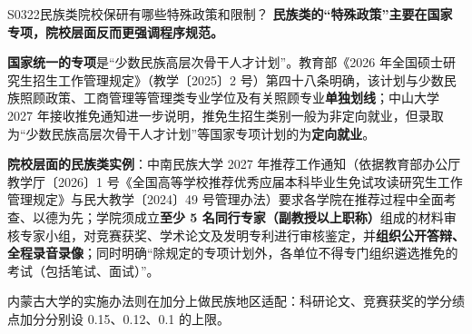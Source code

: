 \begin{qa}{S0322}{民族类院校保研有哪些特殊政策和限制？}
\textbf{民族类的“特殊政策”主要在国家专项，院校层面反而更强调程序规范。}

\textbf{国家统一的专项}是“少数民族高层次骨干人才计划”。教育部《2026 年全国硕士研究生招生工作管理规定》（教学〔2025〕2 号）第四十八条明确，该计划与少数民族照顾政策、工商管理等管理类专业学位及有关照顾专业\textbf{单独划线}；中山大学 2027 年接收推免通知进一步说明，推免生招生类别一般为非定向就业，但录取为“少数民族高层次骨干人才计划”等国家专项计划的为\textbf{定向就业}。

\textbf{院校层面的民族类实例}：中南民族大学 2027 年推荐工作通知（依据教育部办公厅教学厅〔2026〕1 号《全国高等学校推荐优秀应届本科毕业生免试攻读研究生工作管理规定》与民大教学〔2024〕49 号管理办法）要求各学院在推荐过程中全面考查、以德为先；学院须成立\textbf{至少 5 名同行专家（副教授以上职称）}组成的材料审核专家小组，对竞赛获奖、学术论文及发明专利进行审核鉴定，并\textbf{组织公开答辩、全程录音录像}；同时明确“除规定的专项计划外，各单位不得专门组织遴选推免的考试（包括笔试、面试）”。

内蒙古大学的实施办法则在加分上做民族地区适配：科研论文、竞赛获奖的学分绩点加分分别设 0.15、0.12、0.1 的上限。
\end{qa}

